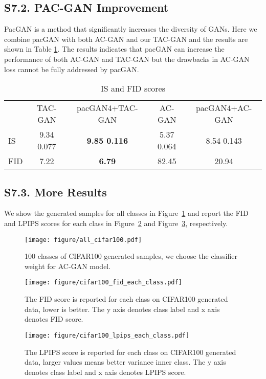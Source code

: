 \subsection*{S7.2. PAC-GAN Improvement}
PacGAN is a method that significantly increases the diversity of GANs. Here we combine pacGAN with both AC-GAN and our TAC-GAN and the results are shown in Table \ref{tab:my_label}.  The results indicates that pacGAN can increase the performance of both AC-GAN and TAC-GAN but the drawbacks in AC-GAN loss cannot be fully addressed by pacGAN. 
\begin{table}[H]
    \centering
 \begin{tabular}{l|c c c c }
  \toprule
   & TAC-GAN & pacGAN4+TAC-GAN & AC-GAN & pacGAN4+AC-GAN \\
  IS & 9.34  0.077 & \textbf{9.85  0.116 } & 5.37  0.064 & 8.54  0.143 \\
  FID & 7.22 & \textbf{6.79} & 82.45 & 20.94 \\
  \bottomrule
 \end{tabular}
    \caption{IS and FID scores}
    \label{tab:my_label}
\end{table}
\subsection*{S7.3. More Results}
We show the generated samples for all classes in Figure~\ref{all_CIFAR100} and report the FID and LPIPS scores for each class in Figure~\ref{cifar100_fid_each_class} and Figure~\ref{cifar100_lpips_each_class}, respectively.
\begin{figure}[H]
\centering\texttt{[image: figure/all\_cifar100.pdf]}
  \caption{100 classes of CIFAR100 generated samples, we choose the classifier weight  for AC-GAN model.}
  \label{all_CIFAR100}
\end{figure}

\begin{figure}[H]
\vspace{-4cm}\hspace{-3cm}\texttt{[image: figure/cifar100\_fid\_each\_class.pdf]}
\vspace{-4cm}\caption{The FID score is reported for each class on CIFAR100 generated data, lower is better. The y axis denotes class label and x axis denotes FID score.}
  \label{cifar100_fid_each_class}
\end{figure}

\begin{figure}[H]
\vspace{-4cm}\hspace{-3cm}\texttt{[image: figure/cifar100\_lpips\_each\_class.pdf]}
\vspace{-4cm}\caption{The LPIPS score is reported for each class on CIFAR100 generated data, larger values means better variance inner class. The y axis denotes class label and x axis denotes LPIPS score.}
  \label{cifar100_lpips_each_class}
\end{figure}


